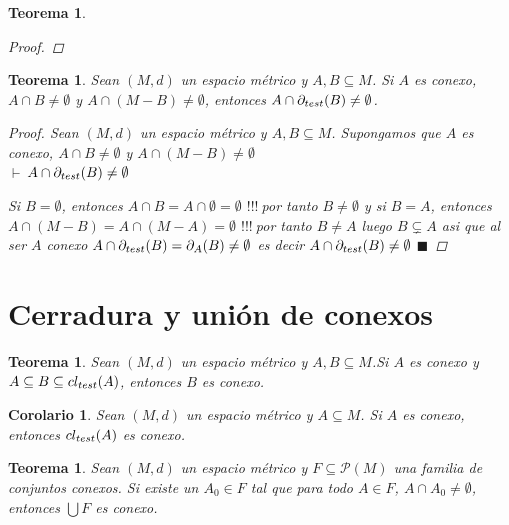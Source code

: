\documentclass[oneside]{book} %
\theoremstyle{Teorema}
\newtheorem{Teorema}[Definicion]{Teorema}
\newtheorem{Corolario}[Definicion]{Corolario}
\theoremstyle{Ejemplos}
\theoremstyle{[Obs]}
\def \test {test}
\newcommand{\cerradura}[2][\test]{\ifx \test #1 {\overline{#2}} \else {cl_{#1}(#2)} \fi} %
\newcommand{\frontera}[2][\test]{\ifx \test #1 {\partial(#2)} \else {\partial_{#1}(#2)} \fi} %
\renewcommand{\{}{\left\lbrace} %
\renewcommand{\}}{\right\rbrace} %
\newcommand{\n}{\cap} %
\newcommand{\U}{\bigcup} %
\renewcommand{\sc}{\subseteq} %
\newcommand{\scp}{\subsetneq} %
\renewcommand{\P}{\mathcal{P}} %
\renewcommand{\qed}{$\blacksquare$} %
\newcommand{\pd}{$\vdash\ $} %
\renewcommand{\c}{$!!!\ $} %
\begin{document}
\begin{Teorema}
\begin{proof}
				\end{proof}

			\end{Teorema}

			\begin{Teorema}\setlength{\parindent}{0em}
			
				Sean $(M, d)$ un espacio métrico y $A, B \sc M$. Si $A$ es conexo, $A \n B \neq \emptyset$ y $A \n (M - B) \neq \emptyset$, entonces $A \n \frontera{B} \neq \emptyset$.

				\begin{proof}
					
					Sean $(M, d)$ un espacio métrico y $A, B \sc M$. Supongamos que $A$ es conexo, $A \n B \neq \emptyset$ y $A \n (M - B) \neq \emptyset$ \\ 
					\pd $A \n \frontera{B} \neq \emptyset$

					Si $B = \emptyset$, entonces $A \n B = A \n \emptyset = \emptyset$ \c por tanto $B \neq \emptyset$ y si $B = A$, entonces $A \n (M - B) = A \n (M - A) = \emptyset$ \c por tanto $B \neq A$ luego $B \scp A$ asi que al ser $A$ conexo $A \n \frontera{B} = \frontera[A]{B} \neq \emptyset$ es decir $A \n \frontera{B} \neq \emptyset$ \qed  
 
				\end{proof}
			
			\end{Teorema}

		\section{Cerradura y unión de conexos}

			\begin{Teorema}\setlength{\parindent}{0em}
			
				Sean $(M, d)$ un espacio métrico y $A, B \sc M$.Si $A$ es conexo y $A \sc B \sc \cerradura{A}$, entonces $B$ es conexo.
			
			\end{Teorema}

			\begin{Corolario}\setlength{\parindent}{0em}
			
				Sean $(M, d)$ un espacio métrico y $A \sc M$. Si $A$ es conexo, entonces $\cerradura{A}$ es conexo.
			
			\end{Corolario}

			\begin{Teorema}\setlength{\parindent}{0em}
			
				Sean $(M, d)$ un espacio métrico y $F \sc \P(M)$ una familia de conjuntos conexos. Si existe un $A_0 \in F$ tal que para todo $A \in F$, $A \n A_0 \neq \emptyset$, entonces $\U F$ es conexo.
			
			\end{Teorema}
\end{document}

